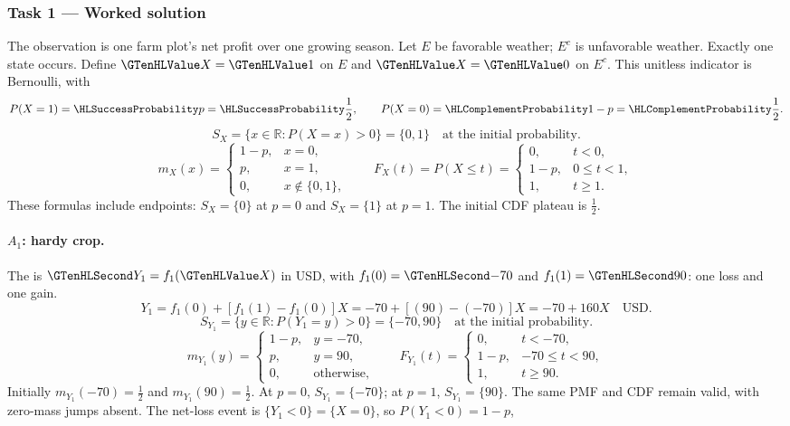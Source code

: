 \subsubsection*{Task 1 --- Worked solution}\label{sol:c3-agriculture-model}
The observation is one farm plot's net profit over one growing season. Let $E$ be favorable weather; $E^c$ is unfavorable weather. Exactly one state occurs. Define $\Indicator{X}=\Indicator{1}$ on $E$ and $\Indicator{X}=\Indicator{0}$ on $E^c$. This unitless indicator is Bernoulli, with
\[P(X=1)=\SuccessProb{p}=\SuccessProb{\frac{1}{2}},\qquad P(X=0)=\FailureProb{1-p}=\FailureProb{\frac{1}{2}}.\]
\[S_X=\{x\in\mathbb R:P(X=x)>0\}=\{0,1\}\quad\text{at the initial probability}.\]
\[m_X(x)=\begin{cases}1-p,&x=0,\\p,&x=1,\\0,&x\notin\{0,1\},\end{cases}\qquad F_X(t)=P(X\leq t)=\begin{cases}0,&t<0,\\1-p,&0\leq t<1,\\1,&t\geq1.\end{cases}\]
These formulas include endpoints: $S_X=\{0\}$ at $p=0$ and $S_X=\{1\}$ at $p=1$. The initial CDF plateau is $\frac{1}{2}$.
\paragraph{$A_1$: hardy crop.}
The  is $\Money{Y_1}=f_1(\Indicator{X})$ in USD,
with $f_1(0)=\Money{-70}$ and $f_1(1)=\Money{90}$: one loss and one gain.
\[
Y_1=f_1(0)+[f_1(1)-f_1(0)]X=-70+[(90)-(-70)]X=-70+160X\quad\text{USD}.
\]
\[S_{Y_1}=\{y\in\mathbb R:P(Y_1=y)>0\}=\{-70,90\}\quad\text{at the initial probability}.\]
\[
m_{Y_1}(y)=\begin{cases}1-p,&y=-70,\\p,&y=90,\\0,&\text{otherwise},\end{cases}
\qquad F_{Y_1}(t)=\begin{cases}0,&t<-70,\\1-p,&-70\leq t<90,\\1,&t\geq 90.\end{cases}
\]
Initially $m_{Y_1}(-70)=\frac{1}{2}$ and $m_{Y_1}(90)=\frac{1}{2}$.
At $p=0$, $S_{Y_1}=\{-70\}$; at $p=1$, $S_{Y_1}=\{90\}$.
The same PMF and CDF remain valid, with zero-mass jumps absent.
The net-loss event is $\{Y_1<0\}=\{X=0\}$, so $P(Y_1<0)=1-p$,
